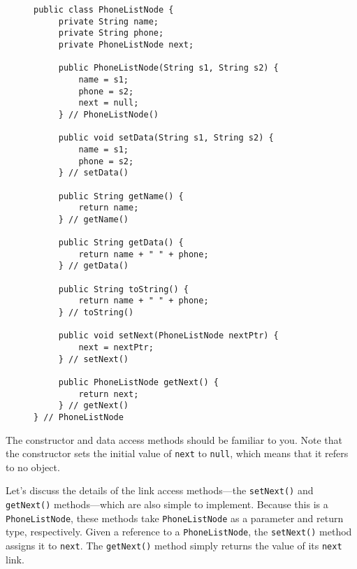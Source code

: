 \begin{figure}[h!]
\jjjprogstart
\begin{jjjlisting}
\begin{lstlisting}
public class PhoneListNode {
     private String name;
     private String phone;
     private PhoneListNode next;

     public PhoneListNode(String s1, String s2) {
         name = s1;
         phone = s2;
         next = null;
     } // PhoneListNode()

     public void setData(String s1, String s2) {
         name = s1;
         phone = s2;
     } // setData()

     public String getName() {
         return name;
     } // getName()

     public String getData() {
         return name + " " + phone;
     } // getData()

     public String toString() {
         return name + " " + phone;
     } // toString()

     public void setNext(PhoneListNode nextPtr) {
         next = nextPtr;
     } // setNext()

     public PhoneListNode getNext() {
         return next;
     } // getNext()
} // PhoneListNode
\end{lstlisting}
\end{jjjlisting}
\end{figure}

\clearpage
The constructor and data access methods should be familiar to
you.  Note that the constructor sets the initial value of {\tt next} to
{\tt null}, which means that it refers to no object.


\noindent Let's discuss the details of the link access methods---the
{\tt setNext()} and {\tt getNext()} methods---which are also simple
to implement.   Because this is a {\tt PhoneListNode}, these methods
take {\tt PhoneListNode} as a parameter and return type, respectively.
Given a reference to a {\tt PhoneListNode}, the {\tt setNext()} method
assigns it to {\tt next}.  The {\tt getNext()} method simply
returns the value of its {\tt next} link.

